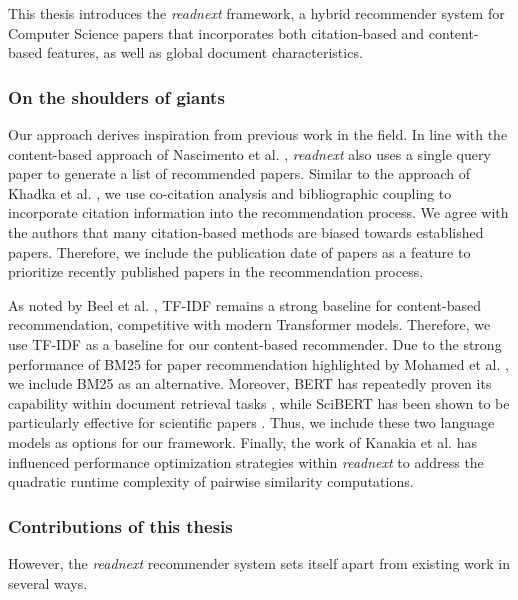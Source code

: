 This thesis introduces the \emph{readnext} framework, a hybrid recommender system for Computer Science papers that incorporates both citation-based and content-based features, as well as global document characteristics.


\subsubsection*{On the shoulders of giants}

Our approach derives inspiration from previous work in the field. In line with the content-based approach of Nascimento et al. \cite{NascimentoSourceIndependent2011}, \emph{readnext} also uses a single query paper to generate a list of recommended papers.
Similar to the approach of Khadka et al. \cite{KhadkaCapturingExploiting2020}, we use co-citation analysis and bibliographic coupling to incorporate citation information into the recommendation process. We agree with the authors that many citation-based methods are biased towards established papers. Therefore, we include the publication date of papers as a feature to prioritize recently published papers in the recommendation process.

As noted by Beel et al. \cite{BeelResearchpaperRecommender2016}, TF-IDF remains a strong baseline for content-based recommendation, competitive with modern Transformer models. Therefore, we use TF-IDF as a baseline for our content-based recommender.
Due to the strong performance of BM25 for paper recommendation highlighted by Mohamed et al. \cite{A.MohamedBERTELMo2019}, we include BM25 as an alternative.
Moreover, BERT has repeatedly proven its capability within document retrieval tasks \cite{AkkalyoncuYilmazApplyingBERT2019,MassAdhocDocument2020}, while SciBERT has been shown to be particularly effective for scientific papers \cite{OstendorffAspectbasedDocument2020}. Thus, we include these two language models as options for our framework.
Finally, the work of Kanakia et al. \cite{KanakiaScalableHybrid2019} has influenced performance optimization strategies within \emph{readnext} to address the quadratic runtime complexity of pairwise similarity computations.


\subsubsection*{Contributions of this thesis}

However, the \emph{readnext} recommender system sets itself apart from existing work in several ways.

